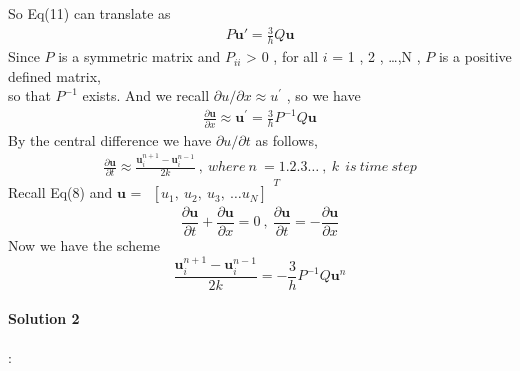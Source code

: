 \documentclass{report}
\begin{document}
\newpage
So Eq(11) can translate as
\begin{align*}
P \textbf{u}'=\frac{3}{h}Q \textbf{u}
\end{align*}
Since $P$ is a symmetric matrix and $P^{}_{ii}$ > 0 , for all $\textit{i}$  = 1 , 2 , \dots ,N , $P$ is a positive defined matrix,\\
so that $P^{-1}$ exists. 
And we recall $\partial{u}/\partial{x} \approx u^{\prime}$ , so we have
\begin{align*}
\frac{\partial{\textbf{u}}}{\partial{x}} \approx \textbf{u}^{\prime} = \frac{3}{h}P^{-1} Q \textbf{u}
\end{align*}
By the central difference we have $\partial{u}/\partial{t}$ as follows,
\begin{align*}
\frac{\partial{\textbf{u}}}{\partial{t}}\approx \frac{\textbf{u}^{n+1}_{i}- \textbf{u}^{n-1}_{i}}{2k}\  , \ where\  n\ = 1.2.3\dots\ ,\ k \ \ is \  time \  step
\end{align*}
Recall Eq(8) and $\textbf{u}$ = 
$
\begin{matrix}
\left[
u^{}_{1},\ 
u^{}_{2},\ 
u^{}_{3},\ 
\dots
u^{}_{N}
\right]
\end{matrix}^T             
$
\begin{displaymath}
 \frac{\partial{\textbf{u}}}{\partial{t}}+\frac{\partial{\textbf{u}}}{\partial{x}} = 0 \ ,\ \frac{\partial{\textbf{u}}}{\partial{t}} = - \frac{\partial{\textbf{u}}}{\partial{x}}
\end{displaymath}
Now we have the scheme
\begin{displaymath}
\frac{\textbf{u}^{n+1}_{i}- \textbf{u}^{n-1}_{i}}{2k}= - \frac{3}{h}P^{-1}Q\textbf{u}^{n}
\end{displaymath}

\newpage
\paragraph{Solution 2} : \\
\end{document}
